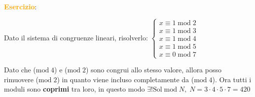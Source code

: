 \begin{boxA}
    \textcolor{orange}{\textbf{Esercizio}}:

    {\centering
        \begin{minipage}[t]{0.45\textwidth}
            Dato il sistema di congruenze lineari, risolverlo:
            $\begin{cases}
                x \equiv 1 \; \text{mod} \; 2 \\
                x \equiv 1 \; \text{mod} \; 3 \\
                x \equiv 1 \; \text{mod} \; 4 \\
                x \equiv 1 \; \text{mod} \; 5 \\
                x \equiv 0 \; \text{mod} \; 7
            \end{cases}$
        \end{minipage}
        \hfill
        \begin{minipage}[t]{0.45\textwidth}
            Dato che ($\text{mod} \; 4$) e ($\text{mod} \; 2$) sono congrui allo stesso valore, allora posso rimuovere ($\text{mod} \; 2$) in quanto viene incluso completamente da ($\text{mod} \; 4$). Ora tutti i moduli sono \textbf{coprimi} tra loro, in questo modo $\exists ! \text{Sol} \; \text{mod} \; N, \; N = 3 \cdot 4 \cdot 5 \cdot 7 = 420$
        \end{minipage}
    \par}


\end{boxA}
